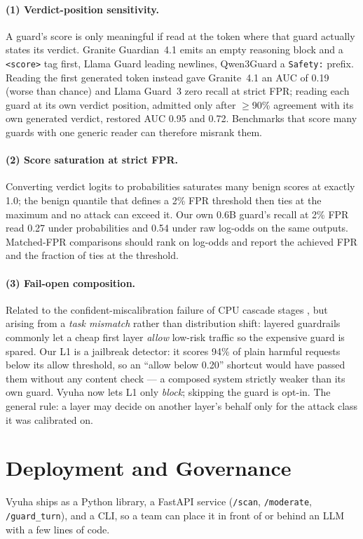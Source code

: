 \documentclass[11pt]{article}
\begin{document}
\paragraph{(1) Verdict-position sensitivity.} A guard's score is only meaningful if read at the token
where that guard actually states its verdict. Granite Guardian~4.1 emits an empty reasoning block and a
\texttt{<score>} tag first, Llama Guard leading newlines, Qwen3Guard a \texttt{Safety:} prefix. Reading
the first generated token instead gave Granite~4.1 an AUC of 0.19 (worse than chance) and Llama Guard~3
zero recall at strict FPR; reading each guard at its own verdict position, admitted only after $\geq$90\%
agreement with its own generated verdict, restored AUC 0.95 and 0.72. Benchmarks that score many guards
with one generic reader can therefore misrank them.

\paragraph{(2) Score saturation at strict FPR.} Converting verdict logits to probabilities saturates
many benign scores at exactly 1.0; the benign quantile that defines a 2\% FPR threshold then ties at the
maximum and no attack can exceed it. Our own 0.6B guard's recall at 2\% FPR read 0.27 under probabilities
and 0.54 under raw log-odds on the same outputs. Matched-FPR comparisons should rank on log-odds and
report the achieved FPR and the fraction of ties at the threshold.

\paragraph{(3) Fail-open composition.} Related to the confident-miscalibration failure of CPU cascade
stages \citep{guardchain}, but arising from a \emph{task mismatch} rather than distribution shift: layered
guardrails commonly let a cheap first layer \emph{allow}
low-risk traffic so the expensive guard is spared. Our L1 is a jailbreak detector: it scores 94\% of
plain harmful requests below its allow threshold, so an ``allow below 0.20'' shortcut would have passed
them without any content check --- a composed system strictly weaker than its own guard. Vyuha now lets
L1 only \emph{block}; skipping the guard is opt-in. The general rule: a layer may decide on another
layer's behalf only for the attack class it was calibrated on.

\section{Deployment and Governance}
Vyuha ships as a Python library, a FastAPI service (\texttt{/scan}, \texttt{/moderate},
\texttt{/guard\_turn}), and a CLI, so a team can place it in front of or behind an LLM with a few
lines of code.
\end{document}
